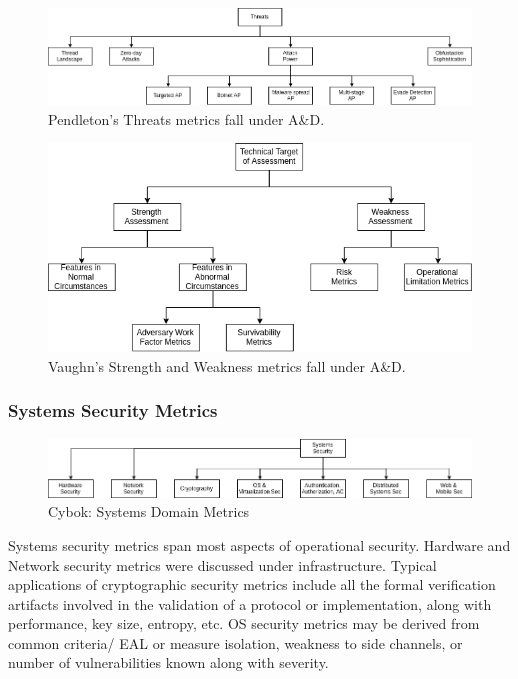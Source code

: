 \begin{figure}[ht]
\centering
\includegraphics[width=.95\linewidth]{resource/img/ch_background/cybok_metrics/pendleton_threats.png}
\caption{Pendleton’s Threats metrics fall under A\&D.
\label{fig:background:cybok_ad_pendleton_threats}}
\end{figure} 

\begin{figure}[ht]
\centering
\includegraphics[width=.75\linewidth]{resource/img/ch_background/cybok_metrics/vaughn_ttoa.png}
\caption{Vaughn’s Strength and Weakness metrics fall under A\&D.
\label{fig:background:cybok_ad_vaugh_ttoa}}
\end{figure} 

\subsubsection{Systems Security Metrics}

\begin{figure}[ht]

\begin{mdframed}
\centering
\includegraphics[width=.95\linewidth]{resource/img/ch_background/cybok_metrics/cybok_systems.png}
\end{mdframed}
\caption{Cybok: Systems Domain Metrics
\label{fig:background:cybok_ad_metrics}}
\end{figure} 

Systems security metrics span most aspects of operational security. Hardware and Network security metrics were discussed under infrastructure. Typical applications of cryptographic security metrics include all the formal verification artifacts involved in the validation of a protocol or implementation, along with performance, key size, entropy, etc. OS security metrics may be derived from common criteria/ EAL or measure isolation, weakness to side channels, or number of vulnerabilities known along with severity. 

